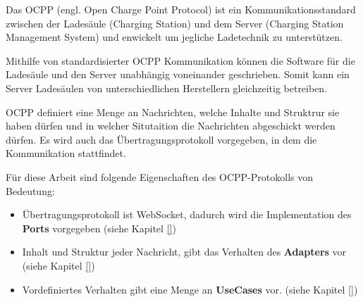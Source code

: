 Das OCPP (engl. Open Charge Point Protocol) ist ein Kommunikationsstandard zwischen der Ladesäule (Charging Station) und dem Server (Charging Station Management System)
und enwickelt um jegliche Ladetechnik zu unterstützen.\cite[Part 0, 3. Seite]{ocppDocs}

Mithilfe von standardisierter OCPP Kommunikation können die Software für die Ladesäule und den Server unabhängig voneinander geschrieben.
Somit kann ein Server Ladesäulen von unterschiedlichen Herstellern gleichzeitig betreiben.

OCPP definiert eine Menge an Nachrichten, welche Inhalte und Struktrur sie haben dürfen und in welcher Situtaition die Nachrichten abgeschickt werden dürfen.
Es wird auch das Übertragungsprotokoll vorgegeben, in dem die Kommunikation stattfindet.

Für diese Arbeit sind folgende Eigenschaften des OCPP-Protokolls von Bedeutung:
\begin{itemize}
    \item Übertragungsprotokoll ist WebSocket, dadurch wird die Implementation des \textbf{Ports} vorgegeben (siehe Kapitel \ref{})
    \item Inhalt und Struktur jeder Nachricht, gibt das Verhalten des \textbf{Adapters} vor (siehe Kapitel \ref{})
    \item Vordefiniertes Verhalten gibt eine Menge an \textbf{UseCases} vor. (siehe Kapitel \ref{})
\end{itemize}